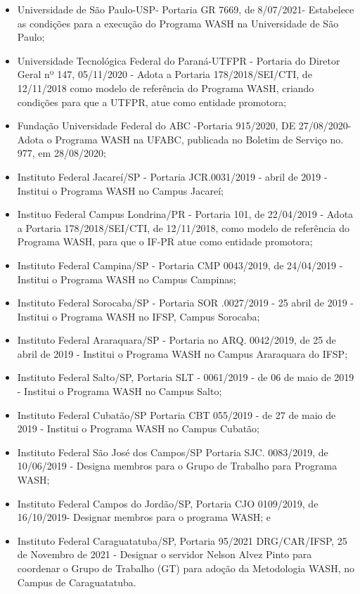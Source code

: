 \begin{itemize}
\item Universidade de São Paulo-USP- Portaria GR 7669, de 8/07/2021- Estabelece as condições para a execução do Programa WASH na Universidade de São Paulo;
\item Universidade Tecnológica Federal do Paraná-UTFPR - Portaria do Diretor Geral nº 147, 05/11/2020 - Adota a Portaria 178/2018/SEI/CTI, de 12/11/2018 como modelo de referência do Programa WASH, criando condições para que a UTFPR, atue como entidade promotora;
\item Fundação Universidade Federal do ABC -Portaria 915/2020, DE 27/08/2020- Adota o Programa WASH na UFABC, publicada no Boletim de Serviço no. 977, em 28/08/2020;
\item Instituto Federal Jacareí/SP - Portaria JCR.0031/2019 - abril de 2019 - Institui o Programa WASH no Campus Jacareí;
\item Instituo Federal Campus Londrina/PR - Portaria 101, de 22/04/2019 - Adota a Portaria 178/2018/SEI/CTI, de 12/11/2018, como modelo de referência do Programa WASH, para que o IF-PR atue como entidade promotora;
\item Instituto Federal Campina/SP - Portaria CMP 0043/2019, de 24/04/2019 - Institui o Programa WASH no Campus Campinas;
\item Instituto Federal Sorocaba/SP - Portaria SOR .0027/2019 - 25 abril de 2019 - Institui o Programa WASH no IFSP, Campus Sorocaba;
\item Instituto Federal Araraquara/SP - Portaria no ARQ. 0042/2019, de 25 de abril de 2019 - Institui o Programa WASH no Campus Araraquara do IFSP;
\item Instituto Federal Salto/SP, Portaria SLT - 0061/2019 - de 06 de maio de 2019 - Institui o Programa WASH no Campus Salto;
\item Instituto Federal Cubatão/SP Portaria CBT 055/2019 - de 27 de maio de 2019 - Institui o Programa WASH no Campus Cubatão;
\item Instituto Federal São José dos Campos/SP Portaria  SJC. 0083/2019, de 10/06/2019 - Designa membros para o Grupo de Trabalho para Programa WASH;
\item Instituto Federal Campos do Jordão/SP, Portaria CJO 0109/2019, de 16/10/2019- Designar membros para o programa WASH; e
\item Instituto Federal Caraguatatuba/SP, Portaria 95/2021 DRG/CAR/IFSP, 25 de Novembro de 2021 - Designar o servidor Nelson Alvez Pinto para coordenar o Grupo de Trabalho (GT) para adoção da Metodologia WASH, no Campus de Caraguatatuba.
\end{itemize}

